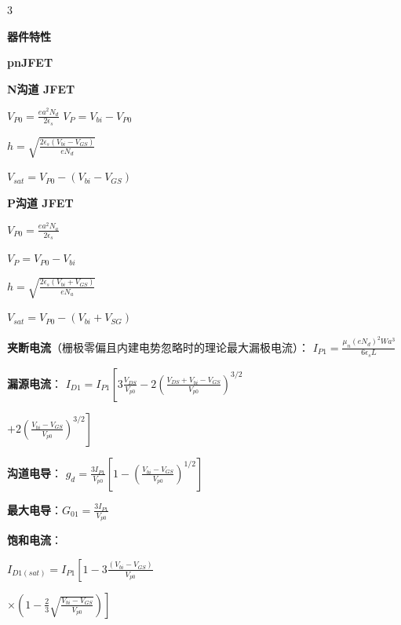 \documentclass[10pt, a4paper, landscape]{article}
\newcommand{\red}[1]{\textbf{\textcolor{myred}{#1}}}
\newcommand{\blue}[1]{\textbf{\textcolor{myblue}{#1}}}
\newcommand{\cbox}[2][yellow]{\begingroup\setlength{\fboxsep}{1pt}\colorbox{#1}{\strut#2}\endgroup}
\newcommand{\hlyellow}[1]{\cbox[hlyellow]{#1}}
\newcommand{\hlgreen}[1]{\cbox[hlgreen]{#1}}
\begin{document}
\begin{multicols*}{3}
\hlyellow{\textbf{器件特性}}

\noindent
\begin{minipage}[t]{0.59\linewidth}

\hlgreen{\textbf{pnJFET}}

    \noindent
    \begin{minipage}[t]{0.49\linewidth}
        \blue{N沟道 JFET}

        $V_{P0} = \frac{ea^2 N_d}{2\epsilon_s}$
        $V_P = V_{bi} - V_{P0}$

        $h = \sqrt{\frac{2\epsilon_s(V_{bi} - V_{GS})}{eN_d}}$

        $V_{sat} = V_{P0} - (V_{bi} - V_{GS})$

    \end{minipage}
    \hfill
    \begin{minipage}[t]{0.49\linewidth}
        \blue{P沟道 JFET}

        $V_{P0} = \frac{ea^2 N_a}{2\epsilon_s}$

        $V_P = V_{P0} - V_{bi}$

        $h = \sqrt{\frac{2\epsilon_s(V_{bi} + V_{GS})}{eN_a}}$

        $V_{sat} = V_{P0} - (V_{bi} + V_{SG})$

    \end{minipage}

    \red{夹断电流}（栅极零偏且内建电势忽略时的理论最大漏极电流）：
    $I_{P1} = \frac{\mu_n (eN_d)^2 W a^3}{6 \epsilon_s L}$

    \red{漏源电流}：
    $
    I_{D1} = I_{P1} \left[ 3 \frac{V_{DS}}{V_{p0}} - 2 \left(\frac{V_{DS} + V_{bi} - V_{GS}}{V_{p0}}\right)^{3/2} \right.
    $

    $\left. + 2 \left(\frac{V_{bi} - V_{GS}}{V_{p0}}\right)^{3/2} \right]$

    \red{沟道电导}：
    $
    g_d = \frac{3I_{P1}}{V_{p0}} \left[ 1 - \left( \frac{V_{bi} - V_{GS}}{V_{p0}} \right)^{1/2} \right]
    $

    \red{最大电导}：$G_{01} = \frac{3I_{P1}}{V_{p0}}$

    \red{饱和电流}：
    
    $I_{D1(sat)} = I_{P1} \left[ 1 - 3 \frac{(V_{bi} - V_{GS})}{V_{p0}} \right.$
    
    $\left. \times \left( 1 - \frac{2}{3} \sqrt{\frac{V_{bi} - V_{GS}}{V_{p0}}} \right) \right]$

\end{minipage}
\hfill
\begin{minipage}[t]{0.39\linewidth}


\end{minipage}
\end{multicols*}
\end{document}
